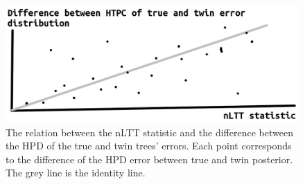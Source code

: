 \begin{figure}[!htbp]
  \includegraphics[width=\textwidth]{figure_5.png}
  \caption{
    The relation between the nLTT statistic and the difference
    between the HPD of the true and twin trees' errors. 
    Each point corresponds to the difference of 
    the HPD error between true and twin posterior.
    The grey line is the identity line.
  }
  \label{fig:nltt_and_error_difference}
\end{figure}

